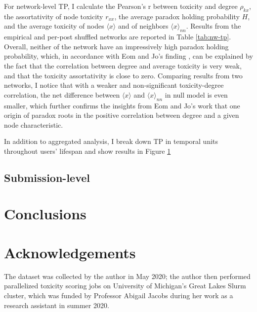\documentclass[10pt,twocolumn,letterpaper]{article}
\begin{document}
For network-level TP, I calculate the Pearson's r between toxicity and degree $\rho_{kx}$, the assortativity of node toxicity $r_{xx}$, the average paradox holding probability $H$, and the average toxicity of nodes $\langle x \rangle$ and of neighbors $\langle x \rangle_{nn}$. Results from the empirical and per-post shuffled networks are reported in Table \ref{tab:nw-tp}. Overall, neither of the network have an impressively high paradox holding probability, which, in accordance with Eom and Jo's finding \cite{eom2014generalized}, can be explained by the fact that the correlation between degree and average toxicity is very weak, and that the toxicity assortativity is close to zero. Comparing results from two networks, I notice that with a weaker and non-significant toxicity-degree correlation, the net difference between $\langle x \rangle$ and $\langle x \rangle_{nn}$ in null model is even smaller, which further confirms the insights from Eom and Jo's work that one origin of paradox roots in the positive correlation between degree and a given node characteristic. 

In addition to aggregated analysis, I break down TP in temporal units throughout users' lifespan and show results in Figure \ref{}


\subsection{Submission-level}

\section{Conclusions}


\section*{Acknowledgements}

The dataset was collected by the author in May 2020; the author then performed parallelized toxicity scoring jobs on University of Michigan's Great Lakes Slurm cluster, which was funded by Professor Abigail Jacobs during her work as a research assistant in summer 2020.





\end{document}

